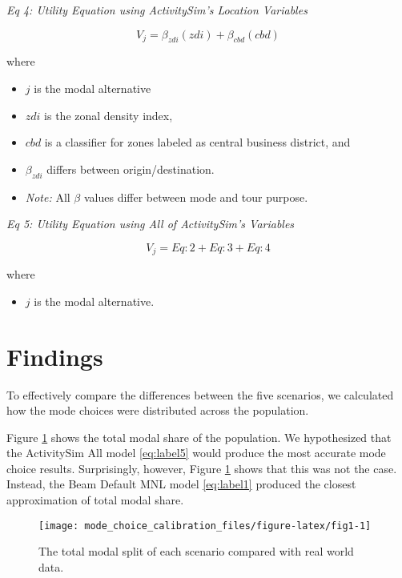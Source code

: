 \documentclass[]{elsarticle} %
\providecommand{\tightlist}{%
  \setlength{\itemsep}{0pt}\setlength{\parskip}{0pt}}
\begin{document}
\emph{Eq 4: Utility Equation using ActivitySim's Location Variables}

\begin{equation}
  V_j = \beta_{zdi}(zdi) + \beta_{cbd}(cbd) \label{eq:label4}
\end{equation}

where

\begin{itemize}
\tightlist
\item
  \(j\) is the modal alternative
\item
  \(zdi\) is the zonal density index,
\item
  \(cbd\) is a classifier for zones labeled as central business district, and
\item
  \(\beta_{zdi}\) differs between origin/destination.
\item
  \emph{Note:} All \(\beta\) values differ between mode and tour purpose.
\end{itemize}

\emph{Eq 5: Utility Equation using All of ActivitySim's Variables}

\begin{equation}  
  V_j = Eq:2 + Eq:3 + Eq:4 \label{eq:label5}
\end{equation}

where

\begin{itemize}
\tightlist
\item
  \(j\) is the modal alternative.
\end{itemize}

\hypertarget{findings}{%
\section{Findings}\label{findings}}

To effectively compare the differences between the five scenarios, we calculated how the mode choices were distributed across the population.

Figure \ref{fig:fig1} shows the total modal share of the population. We hypothesized that the ActivitySim All model \eqref{eq:label5} would produce the most accurate mode choice results. Surprisingly, however, Figure \ref{fig:fig1} shows that this was not the case. Instead, the Beam Default MNL model \eqref{eq:label1} produced the closest approximation of total modal share.

\begin{figure}

{\centering \texttt{[image: mode\_choice\_calibration\_files/figure-latex/fig1-1]} 

}

\caption{The total modal split of each scenario compared with real world data.}\label{fig:fig1}
\end{figure}
\end{document}

